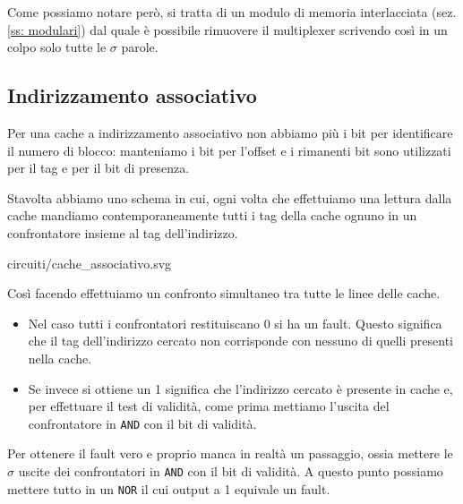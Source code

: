 Come possiamo notare però, si tratta di un modulo di memoria interlacciata (sez. \ref{ss: modulari})
dal quale è possibile rimuovere il multiplexer scrivendo così in un colpo solo tutte le $\sigma$
parole.

\subsection{Indirizzamento associativo}
Per una cache a indirizzamento associativo non abbiamo più i bit per identificare il numero di
blocco: manteniamo i bit per l'offset e i rimanenti bit sono utilizzati per il tag e per il bit
di presenza.

Stavolta abbiamo uno schema in cui, ogni volta che effettuiamo una lettura dalla cache mandiamo
contemporaneamente tutti i tag della cache ognuno in un confrontatore insieme al tag dell'indirizzo.
\begin{center}
	 {circuiti/cache_associativo.svg}
\end{center}
Così facendo effettuiamo un confronto simultaneo tra tutte le linee delle cache.
\begin{itemize}
	\item Nel caso tutti i confrontatori restituiscano 0 si ha un fault. Questo significa che
	      il tag dell'indirizzo cercato non corrisponde con nessuno di quelli presenti nella cache.
	\item Se invece si ottiene un 1 significa che l'indirizzo cercato è presente in cache e, per
	      effettuare il test di validità, come prima mettiamo l'uscita del confrontatore in
	      \verb|AND| con il bit di validità.
\end{itemize}
Per ottenere il fault vero e proprio manca in realtà un passaggio, ossia mettere le $\sigma$ uscite
dei confrontatori in \verb|AND| con il bit di validità. A questo punto possiamo mettere tutto in un
\verb|NOR| il cui output a 1 equivale un fault.

